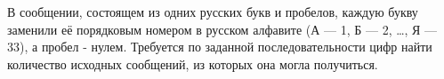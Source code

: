 В сообщении, состоящем из одних русских букв и пробелов, каждую букву заменили
её порядковым номером в русском алфавите (А --- 1, Б --- 2, \ldots, Я --- 33), а пробел
- нулем. Требуется по заданной последовательности цифр найти количество
исходных сообщений, из которых она могла получиться.
